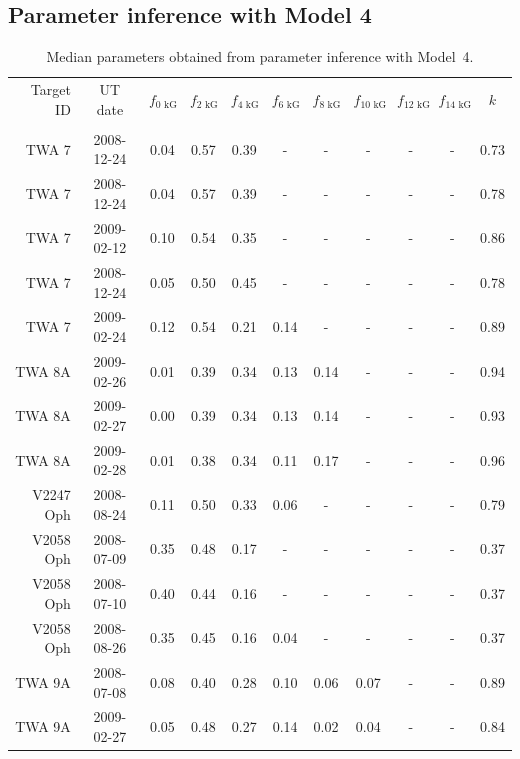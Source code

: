 \documentclass{aa}
\begin{document}
\begin{appendix}
\section{Parameter inference with Model 4}
\begin{table}
\caption{
    Median parameters obtained from parameter inference with Model~4.
}
\label{table:parameter-inference}
\centering
\begin{tabular}{r c c c  c c c c c c c}     %
\hline\hline
Target ID   & UT date & $f_\text{0 kG}$  & $f_\text{2 kG}$  & $f_\text{4 kG}$  & $f_\text{6 kG}$  & $f_\text{8 kG}$  & $f_\text{10 kG}$  & $f_\text{12 kG}$  & $f_\text{14 kG}$  & $k$  \\
            & & & & & & & & & &    \\
\hline
TWA 7       &	2008-12-24 &	0.04	 & 0.57	& 0.39	& -	& -	& -	& -	& -	& 0.73	 \\
TWA 7       &	2008-12-24 &	0.04	 & 0.57	& 0.39	& -	& -	& -	& -	& -	& 0.78	 \\
TWA 7       &	2009-02-12 &	0.10	 & 0.54	& 0.35	& -	& -	& -	& -	& -	& 0.86	 \\
TWA 7       &	2008-12-24 &	0.05	 & 0.50	& 0.45	& -	& -	& -	& -	& -	& 0.78	 \\
TWA 7       &	2009-02-24 &	0.12	 & 0.54	& 0.21	& 0.14	& -	& -	& -	& -	& 0.89	 \\
TWA 8A      &	2009-02-26 &	0.01	 & 0.39	& 0.34	& 0.13	& 0.14	& -	& -	& -	& 0.94	 \\
TWA 8A      &	2009-02-27 &	0.00	 & 0.39	& 0.34	& 0.13	& 0.14	& -	& -	& -	& 0.93	 \\
TWA 8A      &	2009-02-28 &	0.01	 & 0.38	& 0.34	& 0.11	& 0.17	& -	& -	& -	& 0.96	 \\
V2247 Oph   &	2008-08-24 &	0.11	 & 0.50	& 0.33	& 0.06	& -	& -	& -	& -	& 0.79	 \\
V2058 Oph   &	2008-07-09 &	0.35	 & 0.48	& 0.17	& -	& -	& -	& -	& -	& 0.37	 \\
V2058 Oph   &	2008-07-10 &	0.40	 & 0.44	& 0.16	& -	& -	& -	& -	& -	& 0.37	 \\
V2058 Oph   &	2008-08-26 &	0.35	 & 0.45	& 0.16	& 0.04	& -	& -	& -	& -	& 0.37	 \\
TWA 9A      &	2008-07-08 &	0.08	 & 0.40	& 0.28	& 0.10	& 0.06	& 0.07	& -	& -	& 0.89	 \\
TWA 9A      &	2009-02-27 &	0.05	 & 0.48	& 0.27	& 0.14	& 0.02	& 0.04	& -	& -	& 0.84	 \\

\end{tabular}
\end{table}
\end{appendix}
\end{document}
